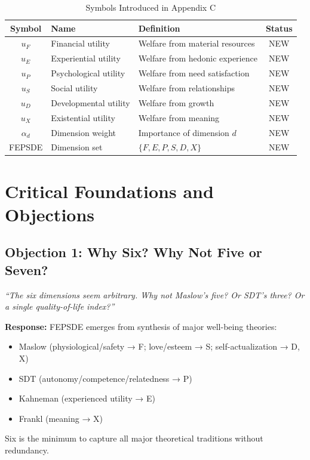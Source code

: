 \begin{table}[htbp]
\centering
\caption{Symbols Introduced in Appendix C}
\label{tab:what-symbols}
\renewcommand{\arraystretch}{1.3}
\begin{tabular}{@{}clp{5.5cm}c@{}}
\toprule
\textbf{Symbol} & \textbf{Name} & \textbf{Definition} & \textbf{Status} \\
\midrule
$u_F$ & Financial utility & Welfare from material resources & NEW \\
$u_E$ & Experiential utility & Welfare from hedonic experience & NEW \\
$u_P$ & Psychological utility & Welfare from need satisfaction & NEW \\
$u_S$ & Social utility & Welfare from relationships & NEW \\
$u_D$ & Developmental utility & Welfare from growth & NEW \\
$u_X$ & Existential utility & Welfare from meaning & NEW \\
$\alpha_d$ & Dimension weight & Importance of dimension $d$ & NEW \\
FEPSDE & Dimension set & $\{F, E, P, S, D, X\}$ & NEW \\
\bottomrule
\end{tabular}
\end{table}


\section{Critical Foundations and Objections}
\label{sec:what-critical}

\subsection{Objection 1: Why Six? Why Not Five or Seven?}

\begin{tcolorbox}[colback=red!5!white, colframe=red!50!black,
    title=Objection: Arbitrary Dimensionality]
\textit{``The six dimensions seem arbitrary. Why not Maslow's five? Or SDT's three?
Or a single quality-of-life index?''}
\end{tcolorbox}

\textbf{Response:}
FEPSDE emerges from synthesis of major well-being theories:
\begin{itemize}
\item Maslow (physiological/safety → F; love/esteem → S; self-actualization → D, X)
\item SDT (autonomy/competence/relatedness → P)
\item Kahneman (experienced utility → E)
\item Frankl (meaning → X)
\end{itemize}
Six is the minimum to capture all major theoretical traditions without redundancy.

